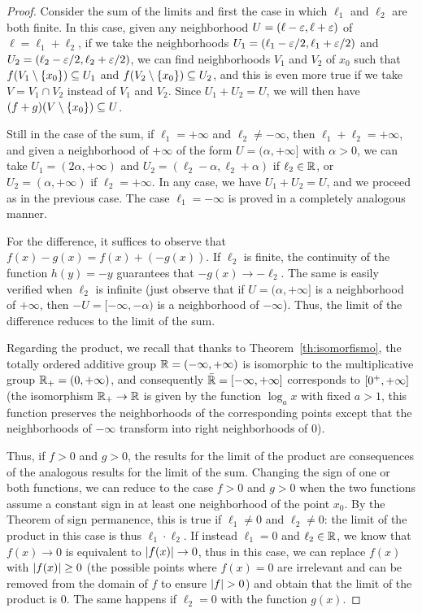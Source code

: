 \begin{proof}
Consider the sum of the limits
and first the case in which $\ell_1$ and $\ell_2$ 
are both finite. 
In this case,
given any neighborhood $U=(\ell-\varepsilon,\ell+\varepsilon)$ 
of $\ell=\ell_1+\ell_2$,
if we take the neighborhoods $U_1=(\ell_1-\varepsilon/2,\ell_1+\varepsilon/2)$ 
and $U_2 = (\ell_2-\varepsilon/2,\ell_2+\varepsilon/2)$, we can find 
neighborhoods $V_1$ and $V_2$ of $x_0$ such that 
$f(V_1\setminus{\left\{ x_0 \right\}}) \subseteq U_1$ and 
$f(V_2\setminus {\left\{ x_0 \right\}}) \subseteq U_2$,
and this is even more true if we take $V=V_1\cap V_2$ 
instead of $V_1$ and $V_2$. 
Since $U_1+U_2 = U$, we will then have 
$(f+g)(V\setminus{\left\{ x_0 \right\}})\subseteq U$.

Still in the case of the sum, 
if $\ell_1=+\infty$ and $\ell_2\neq -\infty$,
then $\ell_1+\ell_2=+\infty$, and 
given a neighborhood of $+\infty$ 
of the form $U=(\alpha,+\infty]$ with $\alpha>0$,
we can take 
$U_1 = (2\alpha,+\infty)$ and $U_2 = (\ell_2-\alpha,\ell_2+\alpha)$ 
if $\ell_2\in {\mathbb R}$, or $U_2 = (\alpha,+\infty)$ if $\ell_2=+\infty$.
In any case, we have $U_1+U_2 = U$, and we proceed as in the previous case.
The case $\ell_1=-\infty$ is proved in a completely analogous manner.

For the difference, it suffices to observe that $f(x)-g(x) = f(x) + (-g(x))$.
If $\ell_2$ is finite, the continuity of the function $h(y)=-y$
guarantees that $-g(x)\to -\ell_2$.
The same is easily verified when $\ell_2$ is infinite 
(just observe that if $U=(\alpha,+\infty]$ is a neighborhood of $+\infty$,
then $-U = [-\infty,-\alpha)$ is a neighborhood of $-\infty$). 
Thus, the limit of the difference reduces to the limit of the sum.

Regarding the product, we recall that thanks 
to Theorem~\ref{th:isomorfismo}, the totally ordered additive group ${\mathbb R} =
\left(-\infty,+\infty\right)$
is isomorphic to the multiplicative group ${\mathbb R}_+ = \left(0,+\infty\right)$,
and consequently $\bar {{\mathbb R}} = \left[-\infty,+\infty\right]$
corresponds to $\left[0^+,+\infty\right]$
(the isomorphism ${\mathbb R}_+\to {\mathbb R}$ is given by the function $\log_a x$ with fixed
$a>1$,
this function preserves the neighborhoods of the corresponding points except
that
the neighborhoods of $-\infty$ transform into right neighborhoods of $0$).

Thus, if $f > 0$ and $g > 0$, the results for the limit of the product 
are consequences of the analogous results for the limit of the sum.
Changing the sign of one or both functions, we can 
reduce to the case $f > 0$ and $g > 0$ when the two functions assume 
a constant sign in at least one neighborhood of the point $x_0$.
By the Theorem of sign permanence, this is true if 
$\ell_1\neq 0$ and $\ell_2\neq 0$: the limit of the product in this case 
is thus $\ell_1\cdot \ell_2$.
If instead $\ell_1=0$ and $\ell_2\in{\mathbb R}$, we know that $f(x)\to 0$ 
is equivalent to ${\left|f(x)\right|}\to 0$, thus in this case, we can replace $f(x)$
with ${\left|f(x)\right|}\ge 0$
(the possible points where $f(x)=0$ are irrelevant and can be removed 
from the domain of $f$ to ensure ${\left|f\right|}>0$) and obtain that the limit 
of the product is $0$.
The same happens if $\ell_2=0$ with the function $g(x)$.


\end{proof}
